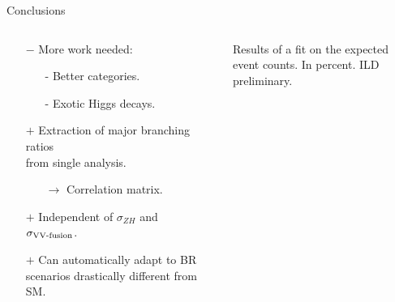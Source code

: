 \begin{frame}{Conclusions}
    \begin{columns}[c, onlytextwidth]
    \begin{column}{0.53\textwidth}
    \begin{itemize}
        \item[$-$] More work needed:
            \begin{itemize}
                \item[-] Better categories.
                \item[-] Exotic Higgs decays.
            \end{itemize}
        \item[$+$] Extraction of major branching ratios\\
                from single analysis.
            \begin{itemize}
                \item[$\rightarrow$] Correlation matrix.
            \end{itemize}
        \item[$+$] Independent of $\sigma_{ZH}$ and $\sigma_{\textnormal{VV-fusion}}$.
        \item[$+$] Can automatically adapt to BR scenarios
            drastically different from SM.
    \end{itemize}
    \end{column}
    \begin{column}{0.02\textwidth}
    \end{column}
    \begin{column}{0.45\textwidth}
    \begin{table}
        \caption{Results of a fit on the
            expected event counts. In percent. ILD preliminary.}
    \end{table}
    \end{column}
    \end{columns}
    \end{frame}
